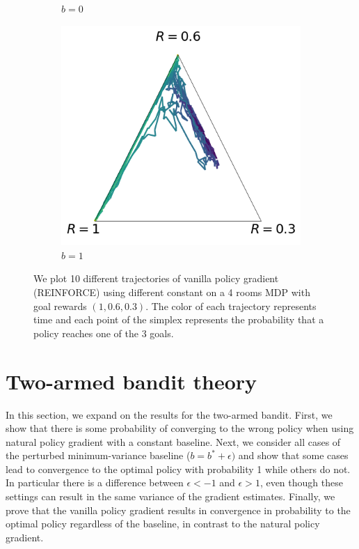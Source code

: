 \begin{figure}[!ht]
\begin{subfigure}[b]{0.32\linewidth}
    \caption{$b=0$}
    \label{fig:4rooms_0}
  \end{subfigure}
  \begin{subfigure}[b]{0.32\linewidth}
    \includegraphics[width=\textwidth]{articles/baselines/figs/baseline_4rooms/4rooms_4.png}
    \caption{$b=1$}
    \label{fig:4rooms_1}
  \end{subfigure}

  \caption{We plot 10 different trajectories of vanilla policy gradient (REINFORCE) using different constant on a 4 rooms MDP with goal rewards $(1, 0.6, 0.3)$. The color of each trajectory represents time and each point of the simplex represents the probability that a policy reaches one of the 3 goals.~\label{fig:trajectories_4rooms}}
\end{figure}






\section{Two-armed bandit theory}
\label{app:theory_2arm}
In this section, we expand on the results for the two-armed bandit. First, we show that there is some probability of converging to the wrong policy when using natural policy gradient with a constant baseline.
Next, we consider all cases of the perturbed minimum-variance baseline ($b = b^* + \epsilon)$ and show that some cases lead to convergence to the optimal policy with probability 1 while others do not. In particular there is a difference between $\epsilon < -1 $ and $\epsilon > 1$, even though these settings can result in the same variance of the gradient estimates. 
Finally, we prove that the vanilla policy gradient results in convergence in probability to the optimal policy regardless of the baseline, in contrast to the natural policy gradient. 

